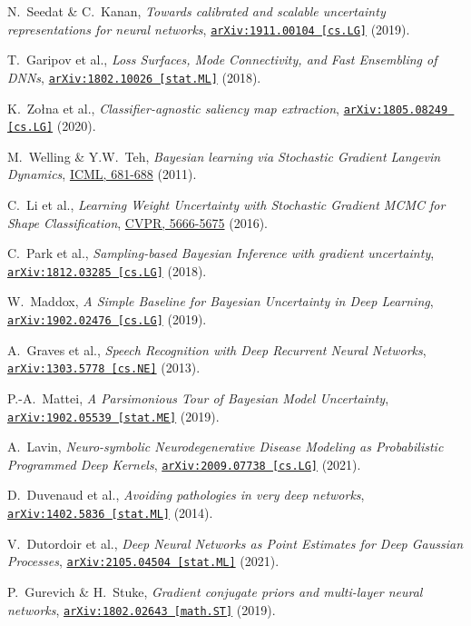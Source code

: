 \documentclass{article}
\begin{document}
\begin{thebibliography}{11}
    N.~Seedat \& C.~Kanan,
    \textit{Towards calibrated and scalable uncertainty representations for neural networks},
    \href{https://arxiv.org/abs/1911.00104}{\texttt{arXiv:1911.00104 [cs.LG]}} (2019).

    T.~Garipov et al.,
    \textit{Loss Surfaces, Mode Connectivity, and Fast Ensembling of DNNs},
    \href{https://arxiv.org/abs/1802.10026}{\texttt{arXiv:1802.10026 [stat.ML]}} (2018).

    K.~Zołna et al.,
    \textit{Classifier-agnostic saliency map extraction},
    \href{https://arxiv.org/abs/1805.08249}{\texttt{arXiv:1805.08249 [cs.LG]}} (2020).

    M.~Welling \& Y.W.~Teh,
    \textit{Bayesian learning via Stochastic Gradient Langevin Dynamics},
    \href{https://dl.acm.org/doi/10.5555/3104482.3104568}{ICML, 681-688} (2011).

    C.~Li et al.,
    \textit{Learning Weight Uncertainty with Stochastic Gradient MCMC for Shape Classification},
    \href{https://doi.org/10.1109/CVPR.2016.611}{CVPR, 5666-5675} (2016).

    C.~Park et al.,
    \textit{Sampling-based Bayesian Inference with gradient uncertainty},
    \href{https://arxiv.org/abs/1812.03285}{\texttt{arXiv:1812.03285 [cs.LG]}} (2018).

    W.~Maddox,
    \textit{A Simple Baseline for Bayesian Uncertainty in Deep Learning},
    \href{https://arxiv.org/abs/1902.02476}{\texttt{arXiv:1902.02476 [cs.LG]}} (2019).

    A.~Graves et al.,
    \textit{Speech Recognition with Deep Recurrent Neural Networks},
    \href{https://arxiv.org/abs/1303.5778}{\texttt{arXiv:1303.5778 [cs.NE]}} (2013).

    P.-A.~Mattei,
    \textit{A Parsimonious Tour of Bayesian Model Uncertainty},
    \href{https://arxiv.org/abs/1910.02600}{\texttt{arXiv:1902.05539 [stat.ME]}} (2019).

    A.~Lavin,
    \textit{Neuro-symbolic Neurodegenerative Disease Modeling as Probabilistic Programmed Deep Kernels},
    \href{https://arxiv.org/abs/2009.07738}{\texttt{arXiv:2009.07738 [cs.LG]}} (2021).

    D.~Duvenaud et al., 
    \textit{Avoiding pathologies in very deep networks},
    \href{https://arxiv.org/abs/1402.5836}{\texttt{arXiv:1402.5836 [stat.ML]}} (2014).

    V.~Dutordoir et al.,
    \textit{Deep Neural Networks as Point Estimates for Deep Gaussian Processes},
    \href{https://arxiv.org/abs/2105.04504}{\texttt{arXiv:2105.04504 [stat.ML]}} (2021).

    P.~Gurevich \& H.~Stuke,
    \textit{Gradient conjugate priors and multi-layer neural networks},
    \href{https://arxiv.org/abs/1802.02643}{\texttt{arXiv:1802.02643 [math.ST]}} (2019).
\end{thebibliography}
\end{document}
